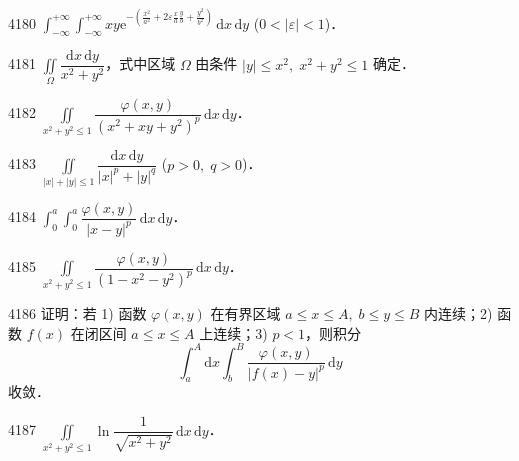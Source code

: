 \begin{prob}[S]{4180}
$\displaystyle\int_{-\infty}^{+\infty} \int_{-\infty}^{+\infty} xy \mathrm{e}^{-\left(\frac{x^2}{a^2} + 2\varepsilon \frac{x}{a}\frac{y}{b} + \frac{y^2}{b^2}\right)} \,\mathrm{d}x\,\mathrm{d}y$ ($0 < |\varepsilon| < 1$)．
\end{prob}


\begin{prob}[S]{4181}
$\displaystyle\iint\limits_{\Omega} \dfrac{\mathrm{d}x\,\mathrm{d}y}{x^2 + y^2}$，式中区域 $\Omega$ 由条件 $|y| \leqslant x^2,\; x^2 + y^2 \leqslant 1$ 确定．
\end{prob}

\begin{prob}[S]{4182}
$\displaystyle\iint\limits_{x^2+y^2 \leqslant 1} \dfrac{\varphi(x,y)}{(x^2 + xy + y^2)^p} \,\mathrm{d}x\,\mathrm{d}y$．
\end{prob}

\begin{prob}[S]{4183}
$\displaystyle\iint\limits_{|x|+|y| \leqslant 1} \dfrac{\mathrm{d}x\,\mathrm{d}y}{|x|^p + |y|^q}$ ($p > 0,\; q > 0$)．
\end{prob}

\begin{prob}[S]{4184}
$\displaystyle\int_0^a \int_0^a \dfrac{\varphi(x,y)}{|x - y|^p} \,\mathrm{d}x\,\mathrm{d}y$．
\end{prob}

\begin{prob}[S]{4185}
$\displaystyle\iint\limits_{x^2+y^2 \leqslant 1} \dfrac{\varphi(x,y)}{(1 - x^2 - y^2)^p} \,\mathrm{d}x\,\mathrm{d}y$．
\end{prob}

\begin{prob}[M]{4186}
证明：若 1) 函数 $\varphi(x,y)$ 在有界区域 $a \leqslant x \leqslant A,\; b \leqslant y \leqslant B$ 内连续；2) 函数 $f(x)$ 在闭区间 $a \leqslant x \leqslant A$ 上连续；3) $p < 1$，则积分
\[
\int_a^A \mathrm{d}x \int_b^B \dfrac{\varphi(x,y)}{|f(x) - y|^p} \,\mathrm{d}y
\]
收敛．
\end{prob}


\begin{prob}[S]{4187}
$\displaystyle\iint\limits_{x^2+y^2 \leqslant 1} \ln\dfrac{1}{\sqrt{x^2 + y^2}} \,\mathrm{d}x\,\mathrm{d}y$．
\end{prob}


